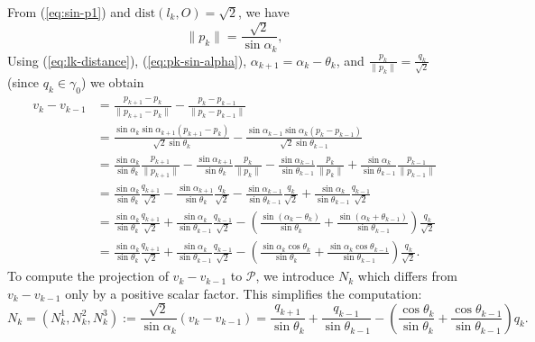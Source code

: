 \documentclass[12pt]{article}
\begin{document}
From (\ref{eq:sin-p1}) and $\text{dist}(l_k,O)= \sqrt{2}$, we have
\begin{equation}\label{eq:pk-sin-alpha}
  \|p_k\|= \frac{\sqrt{2}}{\sin \alpha_k},
\end{equation}
Using  (\ref{eq:lk-distance}), (\ref{eq:pk-sin-alpha}),
$\alpha_{k+1} = \alpha_{k} - \theta_{k}$, and
$\frac{p_k}{\|p_k\|}= \frac{q_k}{\sqrt{2}}$ (since $q_k\in \gamma_0$)
we obtain 
\begin{equation*}
  \begin{split}
    {v}_{k}-{v}_{k-1} &= \frac{p_{k+1} - p_k}{\|p_{k+1} - p_k\|} - \frac{p_k - p_{k-1}}{\|p_k - p_{k-1}\|} \\
   & = 
   \frac{\sin \alpha_k \sin \alpha_{k+1 }\left(p_{k+1} - p_k\right)}{\sqrt{2} \sin {\theta_k}}
   -
   \frac{\sin \alpha_{k-1} \sin \alpha_{k }\left(p_{k} - p_{k-1}\right)}{\sqrt{2} \sin {\theta_{k-1}}}\\
   & = 
\frac{\sin \alpha_{k}}{\sin {\theta_{k}}} \frac{p_{k+1}}{\|p_{k+1}\|}
- 
\frac{\sin \alpha_{k+1}}{\sin {\theta_{k}}} \frac{p_{k}}{\|p_{k}\|}
-\frac{\sin \alpha_{k-1}}{\sin {\theta_{k-1}}} \frac{p_k}{\|p_{k}\|}
+ \frac{\sin \alpha_{k}}{\sin {\theta_{k-1}}} \frac{p_{k-1}}{\|p_{k-1}\|}\\
& = 
\frac{\sin \alpha_{k}}{\sin {\theta_{k}}} \frac{q_{k+1}}{\sqrt{2}}
- 
\frac{\sin \alpha_{k+1}}{\sin {\theta_{k}}} \frac{q_{k}}{\sqrt{2}}
-\frac{\sin \alpha_{k-1}}{\sin {\theta_{k-1}}} \frac{q_k}{\sqrt{2}}
+ \frac{\sin \alpha_{k}}{\sin {\theta_{k-1}}} \frac{q_{k-1}}{\sqrt{2}}\\
&= 
\frac{\sin \alpha_{k}}{\sin {\theta_{k}}} \frac{q_{k+1}}{\sqrt{2}}
+  \frac{\sin \alpha_{k}}{\sin {\theta_{k-1}}} \frac{q_{k-1}}{\sqrt{2}}
- \left(
  \frac{\sin (\alpha_{k}-\theta_k)}{\sin {\theta_{k}}}
+  \frac{\sin (\alpha_{k}+ \theta_{k-1})}{\sin {\theta_{k-1}}}
\right)
\frac{q_{k}}{\sqrt{2}}\\
& =\frac{\sin \alpha_{k}}{\sin {\theta_{k}}} \frac{q_{k+1}}{\sqrt{2}}
+  \frac{\sin \alpha_{k}}{\sin {\theta_{k-1}}} \frac{q_{k-1}}{\sqrt{2}}
- \left(
  \frac{\sin \alpha_{k} \cos \theta_k}{\sin {\theta_{k}}}
+  \frac{\sin \alpha_{k} \cos \theta_{k-1} }{\sin {\theta_{k-1}}}
\right)
\frac{q_{k}}{\sqrt{2}}.
  \end{split}
\end{equation*}
To compute the projection of $ {v}_{k}-{v}_{k-1}$ to $\mathcal{P}$, we introduce $N_k$ which differs from $ {v}_{k}-{v}_{k-1}$ only by a positive scalar factor. This simplifies the computation:
\begin{equation}\label{eq:nk}
  N_k=(N_{k}^1,N_{k}^2,N_{k}^3):= \frac{\sqrt{2} }{\sin \alpha_k}
   (  {v}_{k}-{v}_{k-1})
=
\frac{q_{k+1}}{\sin {\theta_{k}}} 
+  \frac{q_{k-1}}{\sin {\theta_{k-1}}} 
- \left(
  \frac{\cos \theta_k}{\sin {\theta_{k}}}
+  \frac{\cos \theta_{k-1} }{\sin {\theta_{k-1}}}
\right)
q_{k} .
\end{equation}
\end{document}
